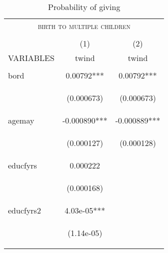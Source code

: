 \documentclass{article}[11pt,subeqn]
\begin{document}
\begin{spacing}{1.25}
\begin{table}[ht]
\caption{Probability of giving}
\vspace{-7mm}
\label{tab:twinreg1}
\begin{center}
\begin{tabular}{lcc} 
\multicolumn{3}{c}{\textsc{birth to multiple children}}\\
& & \\
\toprule
 & (1) & (2) \\
VARIABLES & twind & twind \\ \midrule
\vspace{4pt} & \begin{footnotesize}\end{footnotesize} & \begin{footnotesize}\end{footnotesize} \\
bord & 0.00792*** & 0.00792*** \\
\vspace{4pt} & \begin{footnotesize}(0.000673)\end{footnotesize} & \begin{footnotesize}(0.000673)\end{footnotesize} \\
agemay & -0.000890*** & -0.000889*** \\
\vspace{4pt} & \begin{footnotesize}(0.000127)\end{footnotesize} & \begin{footnotesize}(0.000128)\end{footnotesize} \\
educfyrs & 0.000222 &  \\
\vspace{4pt} & \begin{footnotesize}(0.000168)\end{footnotesize} & \begin{footnotesize}\end{footnotesize} \\
educfyrs2 & 4.03e-05*** &  \\
\vspace{4pt} & \begin{footnotesize}(1.14e-05)\end{footnotesize} & \begin{footnotesize}\end{footnotesize} \\

\end{tabular}
\end{center}
\end{table}
\end{spacing}
\end{document}
